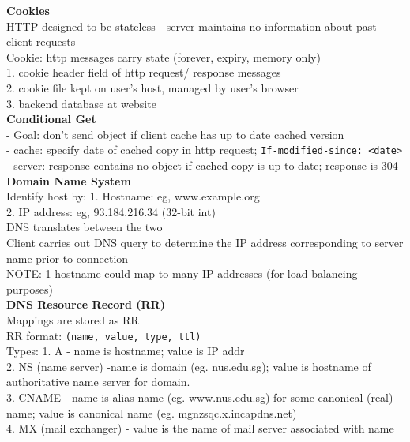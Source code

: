 \documentclass[10pt, a4paper]{article}
\newcommand{\red}[1]{{\color{red}#1}}
\begin{document}
\begin{multicols*}{3}
		\textbf{Cookies}\\
		HTTP designed to be stateless - server maintains no information about past client requests\\
		Cookie: http messages carry state (forever, expiry, memory only)\\
		1. cookie header field of http request/ response messages\\
		2. cookie file kept on user's host, managed by user's browser\\
		3. backend database at website\\

		\textbf{Conditional Get}\\
		- Goal: don't send object if client cache has up to date cached version\\
		- cache: specify date of cached copy in http request; \texttt{If-modified-since: <date>}\\
		- server: response contains no object if cached copy is up to date; response is 304\\

		\textbf{Domain Name System}\\
		Identify host by:
		1. Hostname: eg, www.example.org\\
		2. IP address: eg, 93.184.216.34 (32-bit int)\\
		DNS translates between the two\\
		Client carries out DNS query to determine the IP address corresponding to server name prior to connection\\
		\red{NOTE}: 1 hostname could map to many IP addresses (for load balancing purposes)\\

		\textbf{DNS Resource Record (RR)}\\
		Mappings are stored as RR\\
		RR format: \texttt{(name, value, type, ttl)}\\

		Types:
		1. A - name is hostname; value is IP addr\\
		2. NS (name server) -name is domain (eg. nus.edu.sg); value is hostname of authoritative name server for domain.\\
		3. CNAME - name is alias name (eg. www.nus.edu.sg) for some canonical (real) name; value is canonical name (eg. mgnzsqc.x.incapdns.net)\\
		4. MX (mail exchanger) - value is the name of mail server associated with name\\


\end{multicols*}
\end{document}
